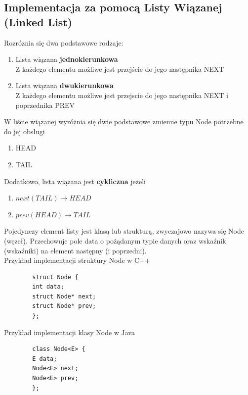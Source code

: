 \documentclass[12pt]{article}
\begin{document}
    \subsection{Implementacja za pomocą Listy Wiązanej (Linked List)}
    Rozróznia się dwa podstawowe rodzaje:
    \begin{enumerate}
        \item Lista wiązana \textbf{jednokierunkowa} \\
        Z każdego elementu możliwe jest przejście do jego następnika NEXT
        \item Lista wiązana \textbf{dwukierunkowa} \\
        Z każdego elementu możliwe jest przejscie do jego następnika NEXT i poprzednika PREV
    \end{enumerate}

    W liście wiązanej wyróżnia się dwie podstawowe zmienne typu Node potrzebne do jej obsługi

    \begin{enumerate}
        \item HEAD
        \item TAIL
    \end{enumerate}

    Dodatkowo, lista wiązana jest \textbf{cykliczna} jeżeli

    \begin{enumerate}
        \item{$next(TAIL) \rightarrow HEAD$}
        \item{$prev(HEAD) \rightarrow TAIL$}
    \end{enumerate}

    Pojedynczy element listy jest klasą lub strukturą, zwyczajowo nazywa się Node (węzeł). Przechowuje pole data o pożądanym typie danych oraz wskaźnik (wskaźniki) na element następny (i poprzedni).
    \\
    Przykład implementacji struktury Node w C++

    \begin{verbatim}
        struct Node {
        int data;
        struct Node* next;
        struct Node* prev;
        };
    \end{verbatim}
    \newpage
    Przykład implementacji klasy Node w Java

    \begin{verbatim}
        class Node<E> {
        E data;
        Node<E> next;
        Node<E> prev;
        };
    \end{verbatim}
\end{document}
